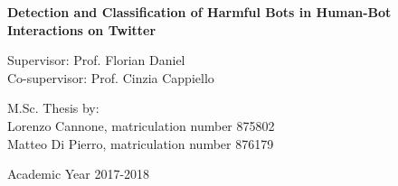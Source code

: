 {\begin{center}
\vspace{1cm} 
\LARGE
\textbf{Detection and Classification of Harmful Bots in Human-Bot Interactions on Twitter}\\


\vspace{2.0cm}

\end{center}


\vspace{2.0cm} 
\large
\begin{flushleft}
Supervisor: Prof. Florian Daniel\\
Co-supervisor: Prof. Cinzia Cappiello
\end{flushleft}

\vspace{1.0cm}

\begin{flushright}
M.Sc. Thesis by: \\ 
{Lorenzo Cannone}, matriculation number 875802 \\ 
{Matteo Di Pierro}, matriculation number 876179 \\
\end{flushright}

\vspace{1cm}

\begin{center}
Academic Year 2017-2018
\end{center} 

\clearpage
}
